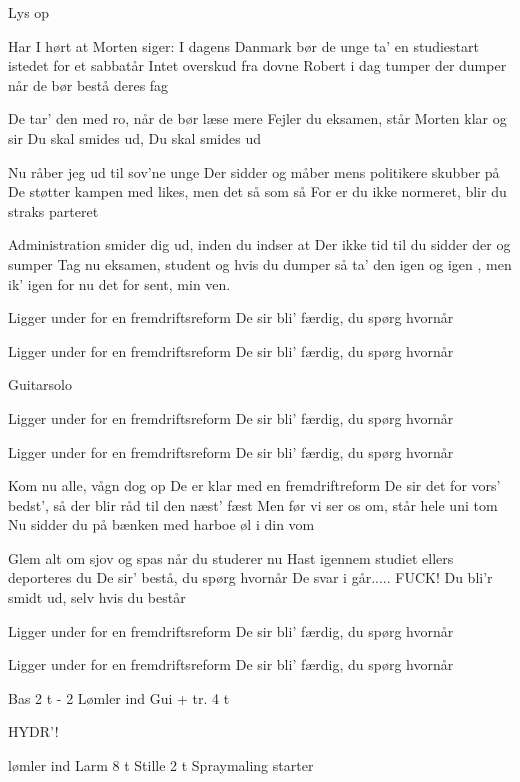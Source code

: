 \documentclass[a4paper,11pt]{article}
\begin{document}
\begin{song}
\scene Lys op

 Har I hørt at Morten siger:
I dagens Danmark bør de unge ta'
en studiestart istedet for et sabbatår
Intet overskud fra dovne Robert i dag
tumper der dumper når de bør bestå deres fag

De tar' den med ro, når de bør læse mere
Fejler du eksamen, står Morten klar og sir
Du skal smides ud, Du skal smides ud

Nu råber jeg ud til sov'ne unge
Der sidder og måber mens politikere skubber på
De støtter kampen med likes, men det så som så
For er du ikke normeret, blir du straks parteret

Administration smider dig ud, inden du indser at
Der ikke tid til du sidder der og sumper
Tag nu eksamen, student og hvis du dumper
så ta' den igen og igen , men ik' igen
for nu det for sent, min ven.

Ligger under for en fremdriftsreform
De sir bli' færdig, du spørg hvornår

Ligger under for en fremdriftsreform
De sir bli' færdig, du spørg hvornår

\scene Guitarsolo

Ligger under for en fremdriftsreform
De sir bli' færdig, du spørg hvornår

Ligger under for en fremdriftsreform
De sir bli' færdig, du spørg hvornår

Kom nu alle, vågn dog op
De er klar med en fremdriftreform
De sir det for vors' bedst', så der blir råd til den næst' fæst
Men før vi ser os om, står hele uni tom
Nu sidder du på bænken med harboe øl i din vom

Glem alt om sjov og spas når du studerer nu
Hast igennem studiet ellers deporteres du
De sir' bestå, du spørg hvornår
De svar i går.....  FUCK!
Du bli'r smidt ud, selv hvis du består

Ligger under for en fremdriftsreform
De sir bli' færdig, du spørg hvornår

Ligger under for en fremdriftsreform
De sir bli' færdig, du spørg hvornår

\scene Bas 2 t    - 2 Lømler ind
\scene Gui + tr. 4 t

 HYDR'!

 lømler ind
\scene Larm 8 t
\scene Stille 2 t
\scene Spraymaling starter


\end{song}
\end{document}

